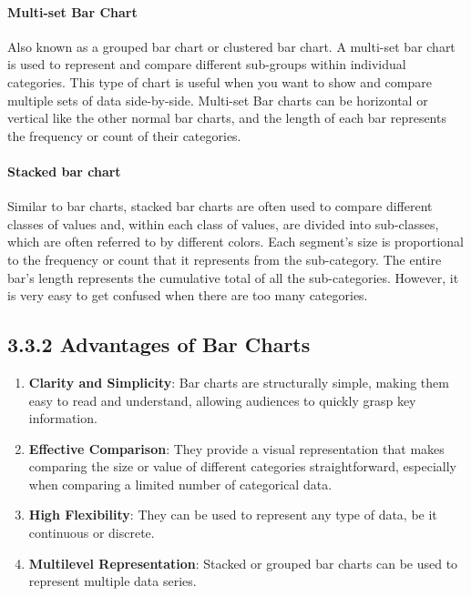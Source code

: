 \documentclass{article}\usepackage[]{graphicx}\usepackage[]{xcolor}
\begin{document}
\paragraph{Multi-set Bar Chart}
Also known as a grouped bar chart or clustered bar chart. A multi-set bar chart is used to represent and compare different sub-groups within individual categories. This type of chart is useful when you want to show and compare multiple sets of data side-by-side.
Multi-set Bar charts can be horizontal or vertical like the other normal bar charts, and the length of each bar represents the frequency or count of their categories.
\paragraph{Stacked bar chart}
Similar to bar charts, stacked bar charts are often used to compare different classes of values and, within each class of values, are divided into sub-classes, which are often referred to by different colors. Each segment's size is proportional to the frequency or count that it represents from the sub-category. The entire bar's length represents the cumulative total of all the sub-categories.
However, it is very easy to get confused when there are too many categories.

\subsection*{3.3.2 Advantages of Bar Charts}
\begin{enumerate}
\item \textbf{Clarity and Simplicity}: Bar charts are structurally simple, making them easy to read and understand, allowing audiences to quickly grasp key information.
    \item \textbf{Effective Comparison}: They provide a visual representation that makes comparing the size or value of different categories straightforward, especially when comparing a limited number of categorical data.
    \item \textbf{High Flexibility}: They can be used to represent any type of data, be it continuous or discrete.
    \item \textbf{Multilevel Representation}: Stacked or grouped bar charts can be used to represent multiple data series.
\end{enumerate}
\end{document}

